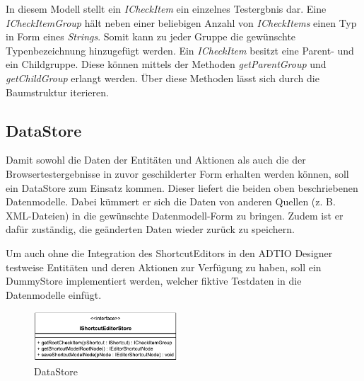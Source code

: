In diesem Modell stellt ein \emph{ICheckItem} ein einzelnes Testergbnis dar. Eine \emph{ICheckItemGroup} hält neben einer beliebigen Anzahl von \emph{ICheckItems} einen Typ in Form eines \emph{Strings}. Somit kann zu jeder Gruppe die gewünschte Typenbezeichnung hinzugefügt werden. Ein \emph{ICheckItem} besitzt eine Parent- und ein Childgruppe. Diese können mittels der Methoden \emph{getParentGroup} und \emph{getChildGroup} erlangt werden. Über diese Methoden lässt sich durch die Baumstruktur iterieren.

\vspace{-5px}

\subsection{DataStore}

Damit sowohl die Daten der Entitäten und Aktionen als auch die der Browsertestergebnisse in zuvor geschilderter Form erhalten werden können, soll ein DataStore zum Einsatz kommen. Dieser liefert die beiden oben beschriebenen Datenmodelle. Dabei kümmert er sich die Daten von anderen Quellen (z. B. XML-Dateien) in die gewünschte Datenmodell-Form zu bringen. Zudem ist er dafür zuständig, die geänderten Daten wieder zurück zu speichern.

Um auch ohne die Integration des ShortcutEditors in den ADTIO Designer testweise Entitäten und deren Aktionen zur Verfügung zu haben, soll ein DummyStore implementiert werden, welcher fiktive Testdaten in die Datenmodelle einfügt.

\vfill

\begin{figure}[H]
	\centering
	\includegraphics[height=70px]{../graphic/diagrams/CD_IShortcutEditorStore/IShortcutEditorStore}
	\caption{DataStore}
	\label{fig:ishortcuteditorstore}
\end{figure}



\newpage